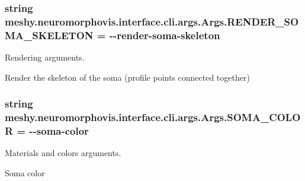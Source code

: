 \subsubsection[{\texorpdfstring{R\+E\+N\+D\+E\+R\+\_\+\+S\+O\+M\+A\+\_\+\+S\+K\+E\+L\+E\+T\+ON}{RENDER_SOMA_SKELETON}}]{\setlength{\rightskip}{0pt plus 5cm}string meshy.\+neuromorphovis.\+interface.\+cli.\+args.\+Args.\+R\+E\+N\+D\+E\+R\+\_\+\+S\+O\+M\+A\+\_\+\+S\+K\+E\+L\+E\+T\+ON = \textquotesingle{}-\/-\/render-\/soma-\/skeleton\textquotesingle{}\hspace{0.3cm}{\ttfamily [static]}}\hypertarget{classmeshy_1_1neuromorphovis_1_1interface_1_1cli_1_1args_1_1Args_aef51611c3bbfab78543a4dd8b8993c2a}{}\label{classmeshy_1_1neuromorphovis_1_1interface_1_1cli_1_1args_1_1Args_aef51611c3bbfab78543a4dd8b8993c2a}


Rendering arguments. 

Render the skeleton of the soma (profile points connected together) 
\subsubsection[{\texorpdfstring{S\+O\+M\+A\+\_\+\+C\+O\+L\+OR}{SOMA_COLOR}}]{\setlength{\rightskip}{0pt plus 5cm}string meshy.\+neuromorphovis.\+interface.\+cli.\+args.\+Args.\+S\+O\+M\+A\+\_\+\+C\+O\+L\+OR = \textquotesingle{}-\/-\/soma-\/color\textquotesingle{}\hspace{0.3cm}{\ttfamily [static]}}\hypertarget{classmeshy_1_1neuromorphovis_1_1interface_1_1cli_1_1args_1_1Args_aac0cd0fc89f6a4704ba2d95a6537dcec}{}\label{classmeshy_1_1neuromorphovis_1_1interface_1_1cli_1_1args_1_1Args_aac0cd0fc89f6a4704ba2d95a6537dcec}


Materials and colors arguments. 

Soma color 
